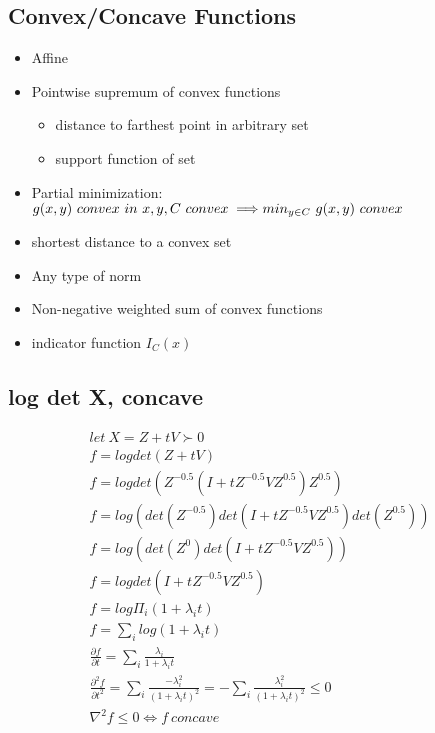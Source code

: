 \documentclass[8pt]{report}
\begin{document}
\begin{multicols*}{2}
  \section{Convex/Concave Functions}

  \begin{itemize}
  \item Affine
  \item Pointwise supremum of convex functions
    \begin{itemize}
    \item distance to farthest point in arbitrary set
    \item support function of set
    \end{itemize}
  \item Partial minimization:\\
    $g(x,y)\ convex\ in\ x,y, C\ convex \implies\\ min_{y\in C}\ g(x,y)\ convex$
  \item shortest distance to a convex set
  \item Any type of norm
  \item Non-negative weighted sum of convex functions
  \item indicator function $I_C(x)$
  \end{itemize}
  
  \subsection{log det X, concave}
  \begin{align*}
    let\ X=Z+tV \succ 0\\
    f=log det(Z+tV)\\
    f=log det(Z^{-0.5}(I+tZ^{-0.5}VZ^{0.5})Z^{0.5})\\
    f=log (det(Z^{-0.5})det(I+tZ^{-0.5}VZ^{0.5})det(Z^{0.5}))\\
    f=log (det(Z^{0})det(I+tZ^{-0.5}VZ^{0.5}))\\
    f=log det(I+tZ^{-0.5}VZ^{0.5})\\
    f=log \Pi_i (1+\lambda_i t)\\
    f=\sum_i log(1+\lambda_i t)\\
    \frac{\partial f}{\partial t} = \sum_i \frac{\lambda_i}{1+\lambda_i t}\\
    \frac{\partial^2 f}{\partial t^2} = \sum_i \frac{-\lambda_i^2}{(1+\lambda_i t)^2} = -\sum_i \frac{\lambda_i^2}{(1+\lambda_i t)^2} \leq 0\\
    \nabla^2 f \leq 0 \iff f\ concave\\
  \end{align*}


\end{multicols*}
\end{document}

